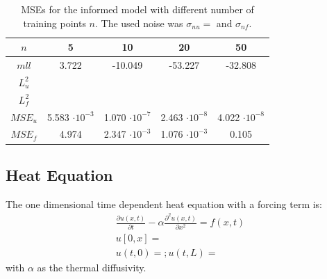 \documentclass{article}
\begin{document}
\begin{table}[htbp!]
    \caption{MSEs for the informed model with different number of training points $n$. The used noise was $\sigma_{nu} = $ and $\sigma_{nf}$.}
    \centering
    \begin{tabular}{ccccc}
        \toprule
        $n$     & 5 & 10 & 20 & 50 \\
        \midrule
        $mll$ &   3.722&  -10.049  &   -53.227 &  -32.808 \\
        $L^2_u$& & & & \\
        $L^2_f$ & & & & \\
        $MSE_u$ & 5.583 $\cdot 10^{-3}$  &  1.070 $\cdot 10^{-7}$  &  2.463 $\cdot 10^{-8}$  &   4.022 $\cdot 10^{-8}$ \\
        $MSE_f$ &  4.974 & 2.347 $\cdot 10^{-3}$  & 1.076 $\cdot 10^{-3}$ &  0.105 \\
        \bottomrule
    \end{tabular}
    
    \label{tab:variing_n_trainingpoints}
\end{table}
\subsection{Heat Equation}
The one dimensional time dependent heat equation with a forcing term is:
\begin{equation}
    \begin{aligned}
        \frac{\partial u(x,t)}{\partial t} - \alpha \frac{\partial^2 u(x,t)}{\partial x^2} = f(x,t) \\ u[0,x] =\\ u(t,0) = ; u(t,L) =
    \end{aligned}
\end{equation}
with $\alpha$ as the thermal diffusivity.
\end{document}
